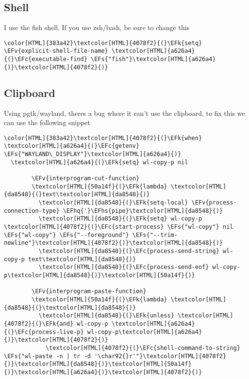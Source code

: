 \documentclass{scrartcl}
\newcommand{\EFk}[1]{\textcolor{EFk}{#1}} %
\newcommand{\EFs}[1]{\textcolor{EFs}{#1}} %
\newcommand{\EFc}[1]{\textcolor{EFc}{#1}} %
\newcommand{\EFv}[1]{\textcolor{EFv}{#1}} %
\newcommand{\EFhq}[1]{\textcolor{EFhq}{#1}} %
\newcommand{\EFhs}[1]{\textcolor{EFhs}{#1}} %
\begin{document}
\subsection{Shell}
\label{sec:orgd2ffdee}
I use the fish shell. If you use zsh/bash, be sure to change this
\begin{Code}
\begin{Verbatim}[]
\color[HTML]{383a42}\textcolor[HTML]{4078f2}{(}\EFk{setq} \EFv{explicit-shell-file-name} \textcolor[HTML]{a626a4}{(}\EFc{executable-find} \EFs{"fish"}\textcolor[HTML]{a626a4}{)}\textcolor[HTML]{4078f2}{)}
\end{Verbatim}
\end{Code}

\subsection{Clipboard}
\label{sec:org9bec253}
Using pgtk/wayland, theres a bug where it can't use the clipboard, to fix this we can use the following snippet
\begin{Code}
\begin{Verbatim}[]
\color[HTML]{383a42}\textcolor[HTML]{4078f2}{(}\EFk{when} \textcolor[HTML]{a626a4}{(}\EFc{getenv} \EFs{"WAYLAND\_DISPLAY"}\textcolor[HTML]{a626a4}{)}
  \textcolor[HTML]{a626a4}{(}\EFk{setq} wl-copy-p nil

        \EFv{interprogram-cut-function}
        \textcolor[HTML]{50a14f}{(}\EFk{lambda} \textcolor[HTML]{da8548}{(}text\textcolor[HTML]{da8548}{)}
          \textcolor[HTML]{da8548}{(}\EFk{setq-local} \EFv{process-connection-type} \EFhq{'}\EFhs{pipe}\textcolor[HTML]{da8548}{)}
          \textcolor[HTML]{da8548}{(}\EFk{setq} wl-copy-p \textcolor[HTML]{4078f2}{(}\EFc{start-process} \EFs{"wl-copy"} nil \EFs{"wl-copy"} \EFs{"--foreground"} \EFs{"--trim-newline"}\textcolor[HTML]{4078f2}{)}\textcolor[HTML]{da8548}{)}
          \textcolor[HTML]{da8548}{(}\EFc{process-send-string} wl-copy-p text\textcolor[HTML]{da8548}{)}
          \textcolor[HTML]{da8548}{(}\EFc{process-send-eof} wl-copy-p\textcolor[HTML]{da8548}{)}\textcolor[HTML]{50a14f}{)}

        \EFv{interprogram-paste-function}
        \textcolor[HTML]{50a14f}{(}\EFk{lambda} \textcolor[HTML]{da8548}{(}\textcolor[HTML]{da8548}{)}
          \textcolor[HTML]{da8548}{(}\EFk{unless} \textcolor[HTML]{4078f2}{(}\EFk{and} wl-copy-p \textcolor[HTML]{a626a4}{(}\EFc{process-live-p} wl-copy-p\textcolor[HTML]{a626a4}{)}\textcolor[HTML]{4078f2}{)}
            \textcolor[HTML]{4078f2}{(}\EFc{shell-command-to-string} \EFs{"wl-paste -n | tr -d '\char92{}r'"}\textcolor[HTML]{4078f2}{)}\textcolor[HTML]{da8548}{)}\textcolor[HTML]{50a14f}{)}\textcolor[HTML]{a626a4}{)}\textcolor[HTML]{4078f2}{)}
\end{Verbatim}
\end{Code}
\end{document}
